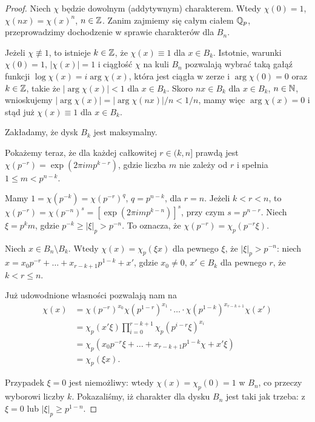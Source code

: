 \begin{proof}
	Niech $\chi$ będzie dowolnym (addytywnym) charakterem. 
	Wtedy $\chi(0) = 1$, $\chi(nx) = \chi(x)^n$, $n \in \mathbb Z$.
	Zanim zajmiemy się całym ciałem $\mathbb Q_p$, przeprowadzimy dochodzenie w sprawie charakterów dla $B_n$.

	Jeżeli $\chi \not \equiv 1$, to istnieje $k \in \mathbb Z$, że $\chi(x) \equiv 1$ dla $x \in B_k$.
	Istotnie, warunki $\chi(0) = 1$, $|\chi(x)| = 1$ i ciągłość $\chi$ na kuli $B_n$ pozwalają wybrać taką gałąź funkcji $\log \chi(x) = i \arg \chi (x)$, która jest ciągła w zerze i $\arg \chi(0) = 0$ oraz $k \in \mathbb Z$, takie że $|\arg \chi(x)| < 1$ dla $x \in B_k$.
	Skoro $nx \in B_k$ dla $x \in B_k$, $n \in \mathbb N$, wnioskujemy $|\arg \chi (x)| = |\arg \chi (nx)| / n < 1/n$, mamy więc $\arg \chi (x) = 0$ i stąd już $\chi (x) \equiv 1$ dla $x \in B_k$.

	Zakładamy, że dysk $B_k$ jest maksymalny.

	Pokażemy teraz, że dla każdej całkowitej $r \in (k, n]$ prawdą jest $\chi(p^{-r}) = \exp (2\pi i m p^{k - r})$, gdzie liczba $m$ nie zależy od $r$ i spełnia $1 \le m < p^{n-k}$.

	Mamy $1 = \chi(p^{-k}) = \chi(p^{-r})^q$, $q = p^{n - k}$, dla $r = n$.
	Jeżeli $k < r < n$, to $\chi(p^{-r}) = \chi(p^{-n})^s = [\exp (2 \pi i m p^{k-n})]^s$, przy czym $s = p^{n - r}$.
	Niech $\xi = p^k m$, gdzie $p^{-k} \ge |\xi|_p > p^{-n}$.
	To oznacza, że $\chi(p^{-r}) = \chi_p(p^{-r}\xi)$.

	Niech $x \in B_n \setminus B_k$. Wtedy $\chi(x) = \chi_p(\xi x)$ dla pewnego $\xi$, że $|\xi|_p > p^{-n}$: niech $x = x_0p^{-r} + \ldots + x_{r - k +1} p^{1-k} + x'$, gdzie $x_0 \neq 0$, $x' \in B_k$ dla pewnego $r$, że $k < r \le n$.

	Już udowodnione własności pozwalają nam na
	\begin{align*}
		\chi(x) & = \chi(p^{-r})^{x_0} \chi(p^{1-r})^{x_1} \cdot \ldots \cdot \chi(p^{1-k})^{x_{r-k+1}} \chi(x') \\
		& = \chi_p(x' \xi) \prod_{i = 0}^{r-k +1} \chi_p(p^{i-r} \xi)^{x_i} \\
		& = \chi_p(x_0p^{-r} \xi + \ldots + x_{r-k+1} p^{1-k} \chi +x' \xi) \\
		&= \chi_p(\xi x).
	\end{align*}

	Przypadek $\xi = 0$ jest niemożliwy: wtedy $\chi(x) = \chi_p(0) = 1$ w $B_n$, co przeczy wyborowi liczby $k$.
	Pokazaliśmy, iż charakter dla dysku $B_n$ jest taki jak trzeba: z $\xi = 0$ lub $|\xi|_p \ge p^{1-n}$.


\end{proof}
